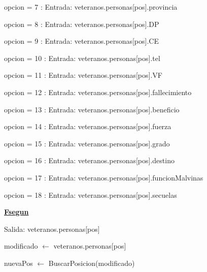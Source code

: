 \documentclass{article}
\begin{document}
                    \hspace{20mm}opcion = 7 : Entrada: veteranos.personas[pos].provincia

                    \hspace{20mm}opcion = 8 : Entrada: veteranos.personas[pos].DP
                    
                    \hspace{20mm}opcion = 9 : Entrada: veteranos.personas[pos].CE
                    
                    \hspace{20mm}opcion = 10 : Entrada: veteranos.personas[pos].tel
                    
                    \hspace{20mm}opcion = 11 : Entrada: veteranos.personas[pos].VF
                    
                    \hspace{20mm}opcion = 12 : Entrada: veteranos.personas[pos].fallecimiento

                    \hspace{20mm}opcion = 13 : Entrada: veteranos.personas[pos].beneficio

                    \hspace{20mm}opcion = 14 : Entrada: veteranos.personas[pos].fuerza

                    \hspace{20mm}opcion = 15 : Entrada: veteranos.personas[pos].grado

                    \hspace{20mm}opcion = 16 : Entrada: veteranos.personas[pos].destino

                    \hspace{20mm}opcion = 17 : Entrada: veteranos.personas[pos].funcionMalvinas

                    \hspace{20mm}opcion = 18 : Entrada: veteranos.personas[pos].secuelas

                \hspace{16mm}\underline{\textbf{Fsegun}}
                
                \hspace{16mm}Salida: veteranos.personas[pos]

                \hspace{16mm}modificado $\leftarrow$ veteranos.personas[pos]

                \hspace{16mm}nuevaPos $\leftarrow$ BuscarPosicion(modificado)
\end{document}
